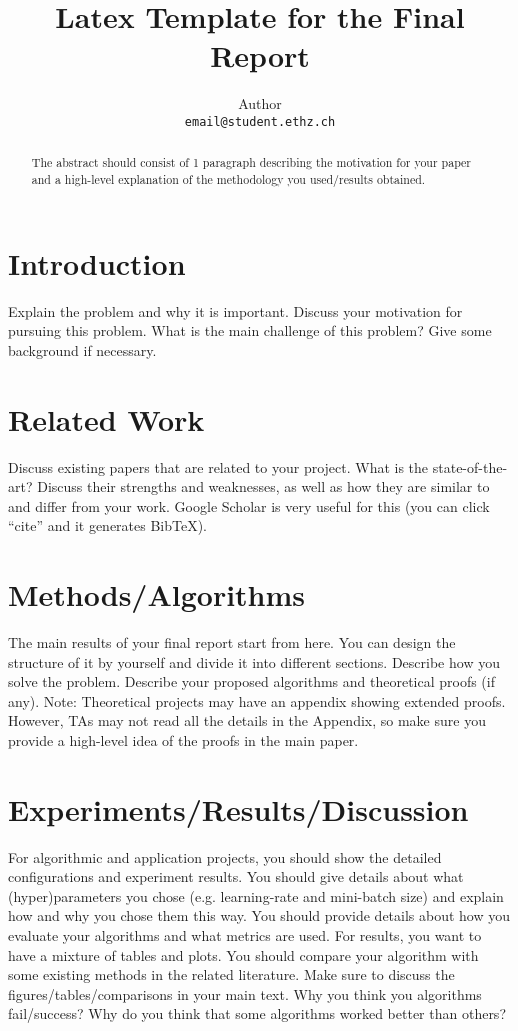 \documentclass{article}
\title{Latex Template for the Final Report}
\author{
    Author \\
    \texttt{email@student.ethz.ch} \\
}
\begin{document}
\maketitle

\begin{abstract}
    The abstract should consist of 1 paragraph describing the motivation for your paper and a high-level explanation of the methodology you used/results obtained.
\end{abstract}


\section{Introduction}
Explain the problem and why it is important. Discuss your motivation for pursuing this problem. What is the main challenge of this problem? Give some background if necessary.


\section{Related Work}
Discuss existing papers that are related to your project. What is the state-of-the-art? Discuss their strengths and weaknesses, as well as how they are similar to and differ from your work. Google Scholar is very useful for this (you can click ``cite'' and it generates BibTeX).


\section{Methods/Algorithms}
The main results of your final report start from here. You can design the structure of it by yourself and divide it into different sections. Describe how you solve the problem. Describe your proposed algorithms and theoretical proofs (if any). Note: Theoretical projects may have an appendix showing extended proofs. However, TAs may not read all the details in the Appendix, so make sure you provide a high-level idea of the proofs in the main paper.


\section{Experiments/Results/Discussion}
For algorithmic and application projects, you should show the detailed configurations and experiment results. You should give details about what (hyper)parameters you chose (e.g. learning-rate and mini-batch size) and explain how and why you chose them this way. You should provide details about how you evaluate your algorithms and what metrics are used. For results, you want to have a mixture of tables and plots. You should compare your algorithm with some existing methods in the related literature. Make sure to discuss the figures/tables/comparisons in your main text. Why you think you algorithms fail/success? Why do you think that some algorithms worked better than others?
\end{document}
